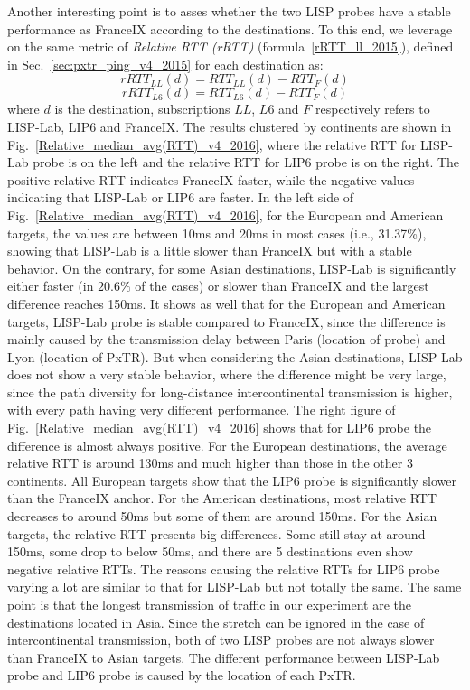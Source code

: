 Another interesting point is to asses whether the two LISP probes have a stable performance as FranceIX according to the destinations. To this end, we leverage on the same metric of \emph{Relative RTT (rRTT)} (formula~\ref{rRTT_ll_2015}), defined in Sec.~\ref{sec:pxtr_ping_v4_2015} for each destination as: 
\begin{equation} 
    \label{rRTT_ll_2016}
    rRTT_{LL}(d)=RTT_{LL}(d) - RTT_{F}(d)
\end{equation}
\begin{equation}
    \label{rRTT_l6_2016}
    rRTT_{L6}(d) = RTT_{L6}(d) - RTT_{F}(d)
\end{equation}
where $d$ is the destination, subscriptions $LL$, $L6$ and $F$ respectively refers to LISP-Lab, LIP6 and FranceIX. The results clustered by continents are shown in Fig.~\ref{Relative_median_avg(RTT)_v4_2016}, where the relative RTT for LISP-Lab probe is on the left and the relative RTT for LIP6 probe is on the right. The positive relative RTT indicates FranceIX faster, while the negative values indicating that LISP-Lab or LIP6 are faster. In the left side of Fig.~\ref{Relative_median_avg(RTT)_v4_2016}, for the European and American targets, the values are between 10ms and 20ms in most cases (i.e., 31.37\%), showing that LISP-Lab is a little slower than FranceIX but with a stable behavior. On the contrary, for some Asian destinations, LISP-Lab is significantly either faster (in $20.6\%$ of the cases) or slower than FranceIX and the largest difference reaches 150ms. It shows as well that for the European and American targets, LISP-Lab probe is stable compared to FranceIX, since the difference is mainly caused by the transmission delay between Paris (location of probe) and Lyon (location of PxTR). But when considering the Asian destinations, LISP-Lab does not show a very stable behavior, where the difference might be very large, since the path diversity for long-distance intercontinental transmission is higher, with every path having very different performance. The right figure of Fig.~\ref{Relative_median_avg(RTT)_v4_2016} shows that for LIP6 probe the difference is almost always positive. For the European destinations, the average relative RTT is around 130ms and much higher than those in the other 3 continents. All European targets show that the LIP6 probe is significantly slower than the FranceIX anchor. For the American destinations, most relative RTT decreases to around 50ms but some of them are around 150ms. For the Asian targets, the relative RTT presents big differences. Some still stay at around 150ms, some drop to below 50ms, and there are 5 destinations even show negative relative RTTs. The reasons causing the relative RTTs for LIP6 probe varying a lot are similar to that for LISP-Lab but not totally the same. The same point is that the longest transmission of traffic in our experiment are the destinations located in Asia. Since the stretch can be ignored in the case of intercontinental transmission, both of two LISP probes are not always slower than FranceIX to Asian targets. The different performance between LISP-Lab probe and LIP6 probe is caused by the location of each PxTR. 